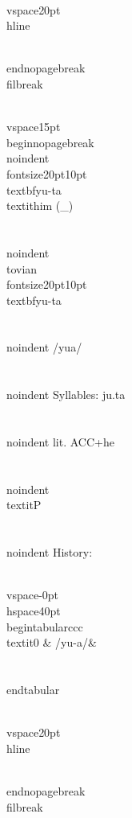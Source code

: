 \\vspace{20pt}\\hline

\\end{nopagebreak}
\\filbreak



\\vspace{15pt}
\\begin{nopagebreak}
\\noindent{\\fontsize{20pt}{10pt}\\textbf{yu-ta} } \\textit{him} (_)\\\\
\\noindent {\\tovian \\fontsize{20pt}{10pt} \\textbf{yu-ta} }\\\\
\\noindent /y{\textprimstress}u{}a/\\\\
\\noindent Syllables: ju.ta\\\\
\\noindent lit. ACC+he\\\\
\\noindent \\textit{P}\\\\


\\noindent History:

\\vspace{-0pt}
\\hspace{40pt}
\\begin{tabular}{ccc}
\\textit{0} & /yu-{}a/& \\\\
\\end{tabular}

\\vspace{20pt}\\hline

\\end{nopagebreak}
\\filbreak



